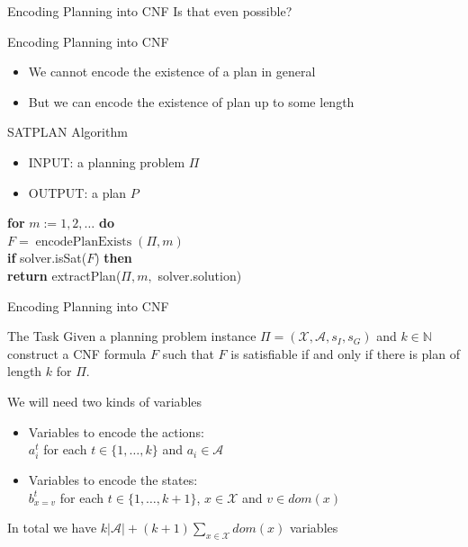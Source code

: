 \documentclass[t]{sdqbeamer}
\begin{document}
\begin{frame}{Encoding Planning into CNF}
Is that even possible?
\end{frame}

\begin{frame}{Encoding Planning into CNF}
\begin{itemize}
	\item We cannot encode the existence of a plan in general
	\item But we can encode the existence of plan up to some length
\end{itemize}
\pause
\begin{block}{SATPLAN Algorithm}
\begin{itemize}
	\item INPUT: a planning problem $\Pi$
	\item OUTPUT: a plan $P$
\end{itemize}
\textbf{for} $m:=1,2,\dots$ \textbf{do}\\
\hspace{1em} $F = \operatorname{encodePlanExists}(\Pi,m)$\\
\hspace{1em} \textbf{if} solver.isSat($F$) \textbf{then}\\
\hspace{1em}\hspace{1em}\textbf{return} extractPlan($\Pi,m,$ solver.solution)\\
\end{block}
\end{frame}


\begin{frame}{Encoding Planning into CNF}
\begin{block}{The Task}
Given a planning problem instance $\Pi = (\mathcal{X}, \mathcal{A}, s_I, s_G)$ and $k\in \mathbb{N}$
construct a CNF formula $F$ such that $F$ is satisfiable if and only if there is plan of length $k$
for $\Pi$.
\end{block}
\pause
We will need two kinds of variables
\begin{itemize}
	\item Variables to encode the actions:\\
	$a_i^t$ for each $t \in \{1,\dots,k\}$ and $a_i \in \mathcal{A}$
	\item Variables to encode the states:\\
	$b_{x=v}^t$ for each $t \in \{1,\dots,k+1\}$, $x \in \mathcal{X}$ and $v \in dom(x)$
\end{itemize}
\vspace{1em}
In total we have $k|\mathcal{A}| + (k+1)\sum_{x \in \mathcal{X}} dom(x)$ variables
\end{frame}
\end{document}

